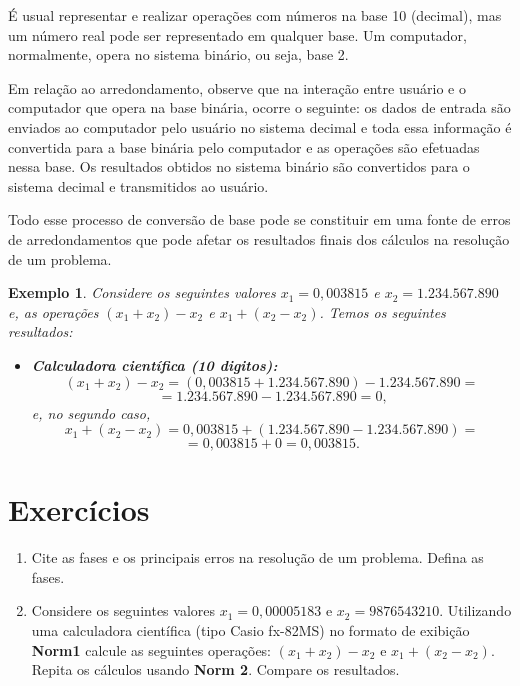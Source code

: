 \documentclass[12pt,a4paper]{book}
\newtheorem{example}{Exemplo}
\numberwithin{example}{chapter}
\numberwithin{remark}{chapter}
\begin{document}
É usual representar e realizar operações com números na base 10 (decimal), mas um número real pode ser representado em qualquer base. Um computador, normalmente, opera no sistema binário, ou seja, base 2.

Em relação ao arredondamento, observe que na interação entre usuário e o computador que opera na base binária, ocorre o seguinte: os dados de entrada são enviados ao computador pelo usuário no sistema decimal e toda essa informação é convertida para a base binária pelo computador e as operações são efetuadas nessa base. Os resultados obtidos no sistema binário são convertidos para o sistema decimal e transmitidos ao usuário.

Todo esse processo de conversão de base pode se constituir em uma fonte de erros de arredondamentos que pode afetar os resultados finais dos cálculos na resolução de um problema.

\begin{example}
	Considere os seguintes valores $x_1=0,003815$ e $x_2=1.234.567.890$ e, as operações $(x_1+x_2)-x_2$ e $x_1+(x_2-x_2)$. Temos os seguintes resultados:

	\begin{itemize}
		\item \textbf{Calculadora científica (10 digitos):}\hfill
		$$(x_1+x_2)-x_2=(0,003815+1.234.567.890)-1.234.567.890=$$
		$$=1.234.567.890-1.234.567.890=0\text{,}$$
		e, no segundo caso,
		$$x_1+(x_2-x_2)=0,003815+(1.234.567.890-1.234.567.890)=$$
		$$=0,003815+0=0,003815\text{.}$$
	\end{itemize}
\end{example}


\section{Exercícios}

\begin{enumerate}
    \item Cite as fases e os principais erros na resolução de um problema. Defina as fases.
    
    \item Considere os seguintes valores $x_1=0,00005183$ e $x_2=9876543210$. Utilizando uma calculadora científica (tipo Casio fx-82MS) no formato de exibição \textbf{Norm1} calcule as seguintes operações: $(x_1+x_2)-x_2$ e $x_1+(x_2-x_2)$. Repita os cálculos usando \textbf{Norm 2}. Compare os resultados.
\end{enumerate}
\end{document}
